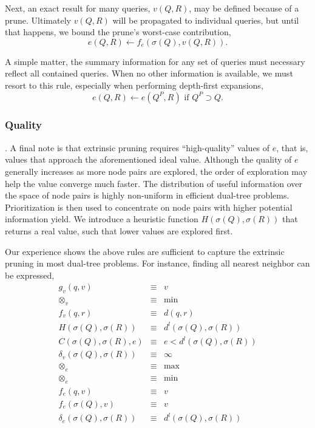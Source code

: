 \documentclass[twoside,leqno,twocolumn]{article}
\newcommand{\summary}{\delta}
\newcommand{\mysubsub}[1]{\subsubsection{#1}. }
\newcommand{\kdparent}[1]{#1^{\!P}}
\newcommand{\lo}[1]{#1^{l}}
\newcommand{\distlo}{\lo{d}}
\newcommand{\dist}[2]{d(#1,#2)}
\newcommand{\nameop}[2]{#1_{\!#2}}
\newcommand{\myop}[1]{\nameop{\otimes}{#1}}
\newcommand{\letterqr}{v}
\newcommand{\inqr}{v}
\newcommand{\opqr}{\myop{\letterqr}}
\newcommand{\fqr}{f_{\letterqr}}
\newcommand{\gqr}{g_{\letterqr}}
\newcommand{\letterqrv}{v}
\newcommand{\inqrv}{v}
\newcommand{\deltaqrv}{\summary_{\letterqrv}}
\newcommand{\lettermu}{e}
\newcommand{\inmu}{e}
\newcommand{\outopmu}{\myop{\lettermu}}
\newcommand{\opmu}{\myop{\lettermu}}
\newcommand{\fmu}{f_{\lettermu}}
\newcommand{\fmuv}{f_{\lettermu}}
\newcommand{\deltamu}{\summary_{\lettermu}}
\newcommand{\canprunemu}{C}
\newcommand{\heurqr}{H}
\newcommand{\outstat}{\sigma}
\begin{document}
Next, an exact result for many queries, $\inqrv(Q, R)$, may be defined because of a prune.
Ultimately $\inqrv(Q, R)$ will be propagated to individual queries, but until that happens, we bound the prune's worst-case contribution,
\begin{equation}
\inmu(Q, R) \gets \fmuv(\outstat(Q), \inqrv(Q, R)).
\label{eqn:muprune}
\end{equation}

\noindent
A simple matter, the summary information for any set of queries must necessary reflect all contained queries.
When no other information is available, we must resort to this rule, especially when performing depth-first expansions,
\begin{equation}
\inmu(Q, R) \gets \inmu(\kdparent{Q}, R) \text{ if } \kdparent{Q} \supset Q.
\label{eqn:muparent}
\end{equation}

\mysubsub{Quality}
A final note is that extrinsic pruning requires ``high-quality'' values of $\inmu$, that is, values that approach the aforementioned ideal value.
Although the quality of $\lettermu$ generally increases as more node pairs are explored, the order of exploration may help the value converge much faster.
The distribution of useful information over the space of node pairs is highly non-uniform in efficient dual-tree problems.
Prioritization is then used to concentrate on node pairs with higher potential information yield.
We introduce a heuristic function $\heurqr(\outstat(Q),\outstat(R))$ that returns a real value, such that lower values are explored first.

Our experience shows the above rules are sufficient to capture the extrinsic pruning in most dual-tree problems.
For instance, finding all nearest neighbor can be expressed,
\begin{eqnarray*}
\gqr(q, \inqr) &\equiv& \inqr
\\
\opqr &\equiv& \min
\\
\fqr(q,r) &\equiv& \dist{q}{r}
\\
\heurqr(\outstat(Q),\outstat(R)) &\equiv& \distlo(\outstat(Q), \outstat(R))
\\
\canprunemu(\outstat(Q), \outstat(R), \lettermu)
 &\equiv& \lettermu < \distlo(\outstat(Q), \outstat(R))
\\
\deltaqrv(\outstat(Q),\outstat(R)) &\equiv& \infty
\\
\outopmu &\equiv& \max
\\
\opmu &\equiv& \min
\\
\fmu(q, \letterqr) &\equiv& \letterqr
\\
\fmuv(\outstat(Q), \letterqrv) &\equiv& \letterqrv
\\
\deltamu(\outstat(Q),\outstat(R)) &\equiv& \distlo(\outstat(Q),\outstat(R))
\end{eqnarray*}
\end{document}
